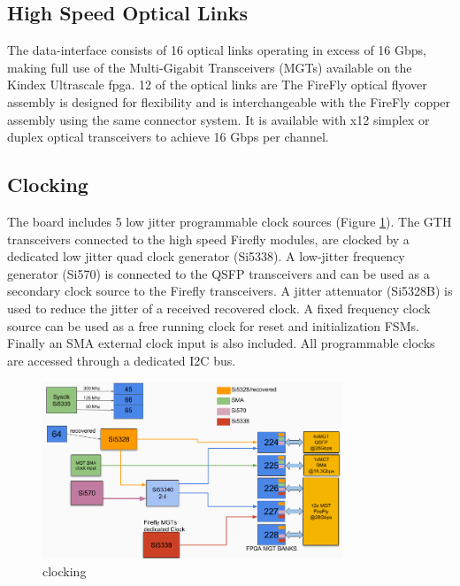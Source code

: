 \documentclass[a4paper]{PoS}
\begin{document}
\subsection{High Speed Optical Links}
The data-interface consists of 16 optical links operating in excess of 16 Gbps, making full use of the Multi-Gigabit Transceivers (MGTs) available on the Kindex Ultrascale fpga. 12 of the optical links are  
The FireFly optical flyover assembly is designed for flexibility and is interchangeable with the FireFly copper assembly using the same connector system. It is available with x12 simplex or duplex optical transceivers to achieve 16 Gbps per channel.


\subsection{Clocking}
The board includes 5 low jitter programmable clock sources (Figure \ref{clocking}). The GTH transceivers connected to the high speed Firefly modules, are clocked by a dedicated low jitter quad clock generator (Si5338). A low-jitter frequency generator (Si570) is connected to the QSFP transceivers and can be used as a secondary clock source to the Firefly transceivers. A jitter attenuator (Si5328B) is used to reduce the jitter of a received recovered clock. A fixed frequency clock source can be used as a free running clock for reset and initialization FSMs. Finally an SMA external clock input is also included. All programmable clocks are accessed through a dedicated I2C bus.

\begin{figure}[h]
\centering
\includegraphics[width=0.8\textwidth]{clocking.png}
\caption{clocking}
\label{clocking}
\end{figure}
\end{document}
